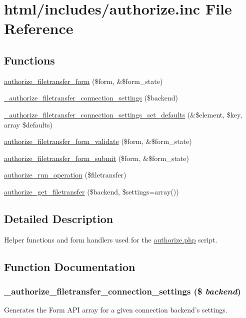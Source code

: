 \hypertarget{authorize_8inc}{
\section{html/includes/authorize.inc File Reference}
\label{authorize_8inc}
}
\subsection*{Functions}
\begin{DoxyCompactItemize}
\item 
\hyperlink{group__forms_gac54653dcbe434c2a6519e228874bba30}{authorize\_\-filetransfer\_\-form} (\$form, \&\$form\_\-state)
\item 
\hyperlink{authorize_8inc_a63baffa11d7909bf853b5966fd558a88}{\_\-authorize\_\-filetransfer\_\-connection\_\-settings} (\$backend)
\item 
\hyperlink{authorize_8inc_a094fe7ec2c912ecbf8057ae67a1f7e89}{\_\-authorize\_\-filetransfer\_\-connection\_\-settings\_\-set\_\-defaults} (\&\$element, \$key, array \$defaults)
\item 
\hyperlink{authorize_8inc_a06e85bbdcebdfe243002736d6e0e7493}{authorize\_\-filetransfer\_\-form\_\-validate} (\$form, \&\$form\_\-state)
\item 
\hyperlink{authorize_8inc_a228779582880d83c95a9bf56fae2e37c}{authorize\_\-filetransfer\_\-form\_\-submit} (\$form, \&\$form\_\-state)
\item 
\hyperlink{authorize_8inc_aba5420b65b60431a0f845b7e09934ecd}{authorize\_\-run\_\-operation} (\$filetransfer)
\item 
\hyperlink{authorize_8inc_ae58f98088f7095a210ee0421586a9f7f}{authorize\_\-get\_\-filetransfer} (\$backend, \$settings=array())
\end{DoxyCompactItemize}


\subsection{Detailed Description}
Helper functions and form handlers used for the \hyperlink{authorize_8php}{authorize.php} script. 

\subsection{Function Documentation}
\hypertarget{authorize_8inc_a63baffa11d7909bf853b5966fd558a88}{
\subsubsection[{\_\-authorize\_\-filetransfer\_\-connection\_\-settings}]{\setlength{\rightskip}{0pt plus 5cm}\_\-authorize\_\-filetransfer\_\-connection\_\-settings (\$ {\em backend})}}
\label{authorize_8inc_a63baffa11d7909bf853b5966fd558a88}
Generates the Form API array for a given connection backend's settings.


